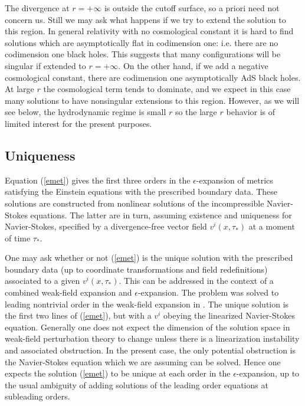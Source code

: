 \documentclass{article}
\def\e{{\epsilon}}
\begin{document}
The divergence at $r=+\infty$ is outside the cutoff surface, so a priori need not concern us.
 Still we may ask
what happens if we try to extend the solution to this region. In general relativity with no cosmological constant it is hard to find solutions which are asymptotically flat in codimension one: i.e. there are no codimension one black holes.  This suggests that many configurations will be singular if extended  to $r=+\infty$.  On the other hand, if we add a negative cosmological constant,  there are codimension one asymptotically AdS black holes.  At large $r$ the cosmological term tends to dominate, and we expect in this case many solutions to have nonsingular extensions to this region. However, as we will see below, the hydrodynamic regime is small $r$ so the large $r$ behavior is of limited interest for the present purposes.


\subsection{Uniqueness}
  Equation (\ref{emet}) gives the first three orders in the $\e$-expansion of metrics satisfying the Einstein equations with the prescribed boundary data. These solutions are constructed from nonlinear solutions of the incompressible Navier-Stokes equations.  The latter are in turn, assuming existence and uniqueness for Navier-Stokes, specified by a divergence-free vector field $v^i(x,\tau_*)$ at a moment of time $\tau_*$.


    One may ask whether or not (\ref{emet}) is the unique solution with the prescribed  boundary data (up to coordinate transformations and field redefinitions)  associated to a given
$v^i(x,\tau_*)$. This can be addressed in the context of a combined weak-field expansion and $\e$-expansion. The problem was solved to leading nontrivial order in the weak-field expansion in \cite{bkls}. The unique solution is the first two lines of (\ref{emet}), but with a $v^i$ obeying the linearized Navier-Stokes equation. Generally one does not expect
the dimension of the solution space in weak-field perturbation theory to change unless there is a linearization instability and associated obstruction. In the present case, the only potential obstruction is the Navier-Stokes equation which we are assuming can be solved.
Hence one expects the solution (\ref{emet}) to be unique at each order in the $\e$-expansion, up to the usual ambiguity of adding solutions of the leading order equations at subleading orders.
%
%
%
\end{document}
